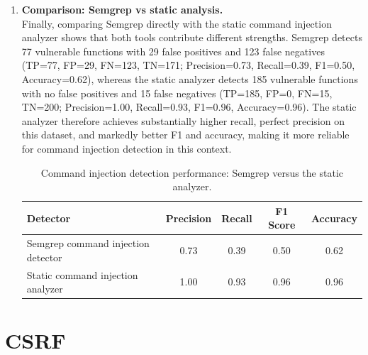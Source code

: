 \begin{enumerate}
  \item \textbf{Comparison: Semgrep vs static analysis.}\\
  Finally, comparing Semgrep directly with the static command injection analyzer shows
  that both tools contribute different strengths. Semgrep detects 77 vulnerable functions
  with 29 false positives and 123 false negatives (TP=77, FP=29, FN=123, TN=171;
  Precision=0.73, Recall=0.39, F1=0.50, Accuracy=0.62), whereas the static analyzer
  detects 185 vulnerable functions with no false positives and 15 false negatives
  (TP=185, FP=0, FN=15, TN=200; Precision=1.00, Recall=0.93, F1=0.96, Accuracy=0.96).
  The static analyzer therefore achieves substantially higher recall, perfect precision on
  this dataset, and markedly better F1 and accuracy, making it more reliable for command
  injection detection in this context.

  \begin{table}[htbp]
    \centering
    \small
    \begin{tabular}{lcccc}
      \textbf{Detector} & \textbf{Precision} & \textbf{Recall} & \textbf{F1 Score} & \textbf{Accuracy} \\
      \hline
      Semgrep command injection detector & 0.73 & 0.39 & 0.50 & 0.62 \\
      Static command injection analyzer & 1.00 & 0.93 & 0.96 & 0.96 \\
    \end{tabular}
    \caption{Command injection detection performance: Semgrep versus the static analyzer.}
    \label{tab:cmd_semgrep_vs_static}
  \end{table}
\end{enumerate}

\section{CSRF}
\label{sec:results_csrf}

